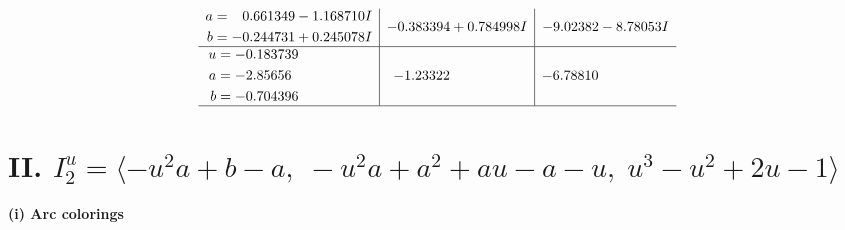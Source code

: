 \documentclass[1p]{elsarticle_modified}
\theoremstyle{definition}
\begin{document}
$$\begin{array}{c|c|c}
\begin{aligned}
a &= \phantom{-}0.661349 - 1.168710 I \\
b &= -0.244731 + 0.245078 I\end{aligned}
 & -0.383394 + 0.784998 I & -9.02382 - 8.78053 I \\ \hline\begin{aligned}
u &= -0.183739\phantom{ +0.000000I} \\
a &= -2.85656\phantom{ +0.000000I} \\
b &= -0.704396\phantom{ +0.000000I}\end{aligned}
 & -1.23322\phantom{ +0.000000I} & -6.78810\phantom{ +0.000000I}\\
 \hline 
 \end{array}$$\newpage\newpage\renewcommand{\arraystretch}{1}
\centering \section*{II. $I^u_{2}= \langle - u^2 a+b- a,\;- u^2 a+a^2+a u- a- u,\;u^3- u^2+2 u-1 \rangle$}
\flushleft \textbf{(i) Arc colorings}\\
\end{document}
